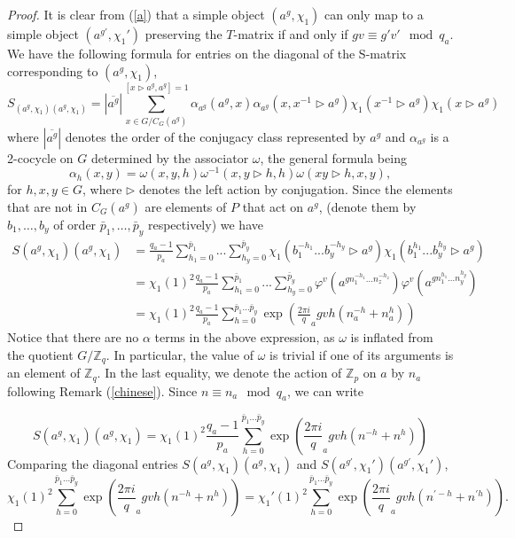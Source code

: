 \documentclass[a4paper, 10pt]{book}
\theoremstyle{definition}
\numberwithin{equation}{chapter}
\newcommand\hit{\triangleright}
\newcommand\inv{^{-1}}
\newcommand\ZZ{\mathbb Z}
\newcommand{\pb}{\bar{p}}
\newcommand{\qb}{q_a}
\begin{document}
\begin{proof}
It is clear from (\ref{a}) that a simple object $(a^g, \chi_1)$ can only map to a simple object $(a^{g'}, \chi_1')$ preserving the $T$-matrix if and only if $gv \equiv g'v'\mod \qb$. We have the following formula for entries on the diagonal of the S-matrix corresponding to $(a^g, \chi_1)$,
\begin{equation*}
	S_{(a^g, \chi_1)(a^g, \chi_1)} = |\overline{a^g}| \sum_{x\in G/C_G(a^g)}^{[x\hit a^g, a^g] = 1} \alpha_{a^g}(a^g, x)\alpha_{a^g}(x, x^{-1}\hit a^g)\chi_1(x^{-1}\hit a^g)\chi_1(x\hit a^g)
\end{equation*}
where $|\overline{a^g}|$ denotes the order of the conjugacy class represented by $a^g$ and $\alpha_{a^g}$ is a 2-cocycle on $G$ determined by the associator $\omega$, the general formula being
\begin{equation}\label{2cocycle}
 	\alpha_h(x, y) = \omega(x, y, h)\omega\inv(x, y\hit h, h )\omega(xy\hit h, x, y),
 \end{equation} for $h, x, y \in G$, where $\hit$ denotes the left action by conjugation. Since the elements that are not in $C_G(a^g)$ are elements of $P$ that act on $a^g$, (denote them by $b_1,\dots,b_y$ of order $\pb_1,\dots,\pb_y $ respectively) we have
\begin{align}  
S(a^g, \chi_1)(a^g, \chi_1) &=  \frac{\qb-1}{p_a}\sum_{h_1=0}^{\pb_1}...\sum_{h_y=0}^{\pb_y}\chi_1(b_1^{-h_1}...b_y^{-h_y}\hit a^g)\chi_1(b_1^{h_1}...b_y^{h_y}\hit a^g)\nonumber\\
&=\chi_1(1)^2\frac{\qb-1}{p_a}\sum_{h_1=0}^{\pb_1}...\sum_{h_y=0}^{\pb_y}\varphi^v (a^{gn_1^{-h_1}\dots n_z^{-h_z}})\varphi^v( a^{gn_1^{h_1}\dots n_y^{h_y}})\nonumber\\
&=\chi_1(1)^2\frac{\qb-1}{p_a}\sum_{h=0}^{\pb_1...\pb_y}\exp(\frac{2\pi i}\qb gvh(n_a^{-h} +n_a^h))
\end{align}
Notice that there are no $\alpha$ terms in the above expression, as $\omega$ is inflated from the quotient $G/\ZZ_q$. In particular, the value of $\omega$ is trivial if one of its arguments is an element of $\ZZ_q$.
In the last equality, we denote the action of $\ZZ_p$ on $a$ by $n_a$ following Remark (\ref{chinese}).  Since $n\equiv n_a\mod \qb$, we can write

\begin{equation*}
	S(a^g, \chi_1)(a^g, \chi_1) =\chi_1(1)^2\frac{\qb-1}{p_a}\sum_{h=0}^{\pb_1...\pb_y}\exp(\frac{2\pi i}\qb gvh(n^{-h} +n^h))
\end{equation*}
Comparing the diagonal entries $S(a^g, \chi_1)(a^g, \chi_1)$ and $S(a^{g'}, \chi_1')(a^{g'}, \chi_1')$,
\begin{equation*}
 	\chi_1(1)^2\sum_{h=0}^{\pb_1...\pb_y}\exp(\frac{2\pi i}\qb gvh(n^{-h} +n^h)) = \chi_1'(1)^2\sum_{h=0}^{\pb_1...\pb_y}\exp(\frac{2\pi i}\qb gvh(n^{\prime-h} +n^{\prime h})).
 \end{equation*}


\end{proof}
\end{document}
